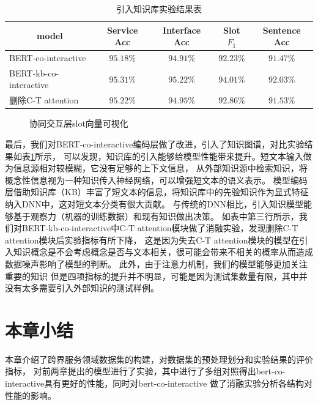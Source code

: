   \begin{table}[htb]
    \centering
    \caption{引入知识库实验结果表}
    \label{tab:kbjieguo}
\begin{tabular}{l|cccc}
  \toprule
  \multicolumn{1}{c|}{\centering model}&Service Acc&Interface Acc&Slot $F_1$&Sentence Acc\\
   \hline
   BERT-co-interactive&$95.18\%$&$94.91\%$&$92.23\%$&$91.47\%$\\
   BERT-kb-co-interactive&$\mathbf{95.31\%}$&$\mathbf{95.22}\%$&$\mathbf{94.01}\%$&$\mathbf{92.03}\%$\\
   删除C-T attention&$95.22\%$&$94.95\%$&$92.86\%$&$91.53\%$\\
  \bottomrule
  \end{tabular}
\end{table}

\begin{figure}[htbp]
  \centering
   \centering
 \caption{协同交互层slot向量可视化}
 \label{fig:visual}
 \end{figure}
最后，我们对BERT-co-interactive编码层做了改进，引入了知识图谱，对比实验结果如表\ref{tab:kbjieguo}所示，
可以发现，知识库的引入能够给模型性能带来提升。短文本输入做为信息源相对较模糊，它没有足够的上下文信息，
从外部知识源中检索知识，将概念性信息视为一种知识传入神经网络，可以增强短文本的语义表示。
模型编码层借助知识库（KB）丰富了短文本的信息，将知识库中的先验知识作为显式特征纳入DNN中，这对短文本分类有很大贡献。
与传统的DNN相比，引入知识模型能够基于观察力（机器的训练数据）和现有知识做出决策。
如表中第三行所示，我们对BERT-kb-co-interactive中C-T attention模块做了消融实验，发现删除C-T attention模块后实验指标有所下降，
这是因为失去C-T attention模块的模型在引入知识概念是不会考虑概念是否与文本相关，很可能会带来不相关的概率从而造成数据噪声影响了模型的判断。
此外，由于注意力机制，我们的模型能够更加关注重要的知识
但是四项指标的提升并不明显，可能是因为测试集数量有限，其中并没有太多需要引入外部知识的测试样例。


  \section{本章小结}
  本章介绍了跨界服务领域数据集的构建，对数据集的预处理划分和实验结果的评价指标，
对前两章提出的模型进行了实验，其中进行了多组对照得出bert-co-interactive具有更好的性能，同时对bert-co-interactive
做了消融实验分析各结构对性能的影响。